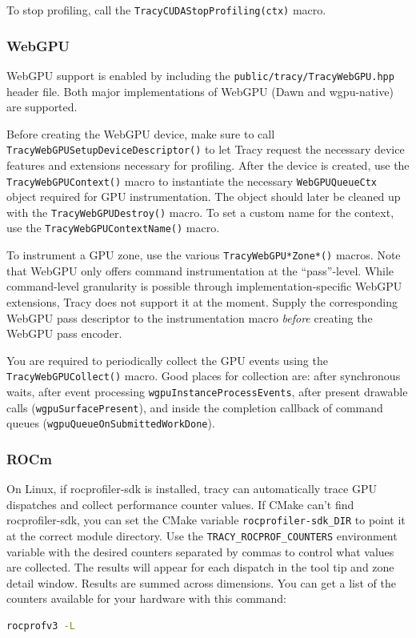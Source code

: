 \documentclass[hidelinks,titlepage,a4paper,twoside]{article}
\begin{document}
To stop profiling, call the \texttt{TracyCUDAStopProfiling(ctx)} macro.

\subsubsection{WebGPU}

WebGPU support is enabled by including the \texttt{public/tracy/TracyWebGPU.hpp} header file. Both major implementations of WebGPU (Dawn and wgpu-native) are supported.

Before creating the WebGPU device, make sure to call \texttt{TracyWebGPUSetupDeviceDescriptor()} to let Tracy request the necessary device features and extensions necessary for profiling. After the device is created, use the \texttt{TracyWebGPUContext()} macro to instantiate the necessary \texttt{WebGPUQueueCtx} object required for GPU instrumentation. The object should later be cleaned up with the \texttt{TracyWebGPUDestroy()} macro. To set a custom name for the context, use the \texttt{TracyWebGPUContextName()} macro.

To instrument a GPU zone, use the various \texttt{TracyWebGPU*Zone*()} macros. Note that WebGPU only offers command instrumentation at the \enquote{pass}-level. While command-level granularity is possible through implementation-specific WebGPU extensions, Tracy does not support it at the moment. Supply the corresponding WebGPU pass descriptor to the instrumentation macro \textit{before} creating the WebGPU pass encoder.

You are required to periodically collect the GPU events using the \texttt{TracyWebGPUCollect()} macro. Good places for collection are: after synchronous waits, after event processing \texttt{wgpuInstanceProcessEvents}, after present drawable calls (\texttt{wgpuSurfacePresent}), and inside the completion callback of command queues (\texttt{wgpuQueueOnSubmittedWorkDone}).

\subsubsection{ROCm}
\label{rocm}

On Linux, if rocprofiler-sdk is installed, tracy can automatically trace GPU dispatches and collect
performance counter values. If CMake can't find rocprofiler-sdk, you can set the CMake variable
\texttt{rocprofiler-sdk\_DIR} to point it at the correct module directory. Use the
\texttt{TRACY\_ROCPROF\_COUNTERS} environment variable with the desired counters separated by commas
to control what values are collected. The results will appear for each dispatch in the tool tip and
zone detail window. Results are summed across dimensions. You can get a list of the counters
available for your hardware with this command:
\begin{lstlisting}[language=sh]
rocprofv3 -L
\end{lstlisting}
\end{document}
